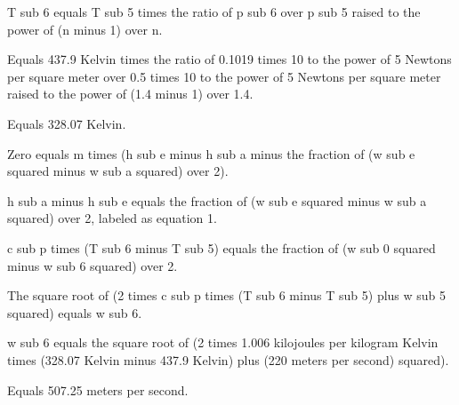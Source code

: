 T sub 6 equals T sub 5 times the ratio of p sub 6 over p sub 5 raised to the power of (n minus 1) over n.

Equals 437.9 Kelvin times the ratio of 0.1019 times 10 to the power of 5 Newtons per square meter over 0.5 times 10 to the power of 5 Newtons per square meter raised to the power of (1.4 minus 1) over 1.4.

Equals 328.07 Kelvin.

Zero equals m times (h sub e minus h sub a minus the fraction of (w sub e squared minus w sub a squared) over 2).

h sub a minus h sub e equals the fraction of (w sub e squared minus w sub a squared) over 2, labeled as equation 1.

c sub p times (T sub 6 minus T sub 5) equals the fraction of (w sub 0 squared minus w sub 6 squared) over 2.

The square root of (2 times c sub p times (T sub 6 minus T sub 5) plus w sub 5 squared) equals w sub 6.

w sub 6 equals the square root of (2 times 1.006 kilojoules per kilogram Kelvin times (328.07 Kelvin minus 437.9 Kelvin) plus (220 meters per second) squared).

Equals 507.25 meters per second.